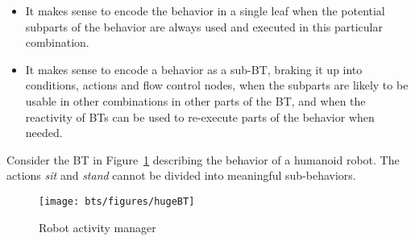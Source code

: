\begin{itemize}
\item 
It makes sense to encode the behavior in a single leaf when the potential
 subparts of the behavior are always used and executed in this particular combination.%
 
\item
It makes sense to encode a behavior as a sub-BT, braking it up into conditions, actions and flow control nodes,
when the subparts are likely to be usable in other combinations in other parts of the BT,
and when the reactivity of BTs can be used to re-execute parts of the behavior when needed.%
 
\end{itemize}


\label{design:ex:reused}
Consider the BT in Figure~\ref{design:fig:reused} describing the behavior of a humanoid robot. The actions \emph{sit} and \emph{stand} 
cannot be divided into meaningful sub-behaviors.

\begin{figure}[h]
\centering
  \texttt{[image: bts/figures/hugeBT]}
\caption{Robot activity manager}

\label{design:fig:reused}
\end{figure}


\label{design:ex:closed}

